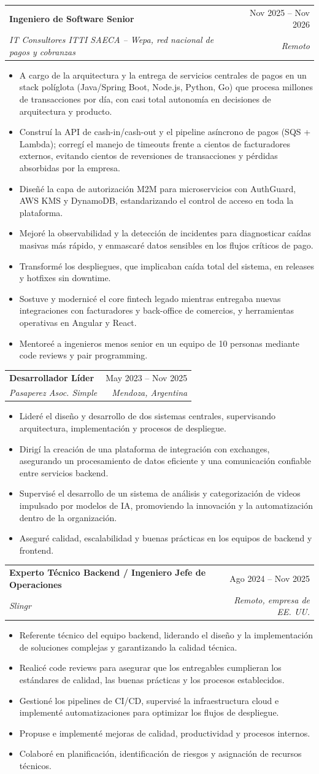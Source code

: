 \documentclass[letterpaper,11pt]{article}
\makeatletter
\newcommand{\resumeItem}[1]{
  \item\small{
    {#1 \vspace{-1pt}}
  }
}
\newcommand{\resumeSubheading}[4]{
  \needspace{4\baselineskip}\vspace{-1pt}\item
    \begin{tabular*}{0.97\textwidth}[t]{l@{\extracolsep{\fill}}r}
      \textbf{#1} & #2 \\
      \textit{\small#3} & \textit{\small #4} \\
    \end{tabular*}\vspace{-5pt}
}
\newcommand{\resumeItemListStart}{\begin{itemize}}
\newcommand{\resumeItemListEnd}{\end{itemize}\vspace{-3pt}}
\makeatother
\begin{document}
\resumeSubheading
  {Ingeniero de Software Senior}{Nov 2025 -- Nov 2026}
  {IT Consultores ITTI SAECA -- Wepa, red nacional de pagos y cobranzas}{Remoto}
  \resumeItemListStart
    \resumeItem{A cargo de la arquitectura y la entrega de servicios centrales de pagos en un stack políglota (Java/Spring Boot, Node.js, Python, Go) que procesa millones de transacciones por día, con casi total autonomía en decisiones de arquitectura y producto.}
    \resumeItem{Construí la API de cash-in/cash-out y el pipeline asíncrono de pagos (SQS + Lambda); corregí el manejo de timeouts frente a cientos de facturadores externos, evitando cientos de reversiones de transacciones y pérdidas absorbidas por la empresa.}
    \resumeItem{Diseñé la capa de autorización M2M para microservicios con AuthGuard, AWS KMS y DynamoDB, estandarizando el control de acceso en toda la plataforma.}
    \resumeItem{Mejoré la observabilidad y la detección de incidentes para diagnosticar caídas masivas más rápido, y enmascaré datos sensibles en los flujos críticos de pago.}
    \resumeItem{Transformé los despliegues, que implicaban caída total del sistema, en releases y hotfixes sin downtime.}
    \resumeItem{Sostuve y modernicé el core fintech legado mientras entregaba nuevas integraciones con facturadores y back-office de comercios, y herramientas operativas en Angular y React.}
    \resumeItem{Mentoreé a ingenieros menos senior en un equipo de 10 personas mediante code reviews y pair programming.}
  \resumeItemListEnd

\resumeSubheading
  {Desarrollador Líder}{May 2023 -- Nov 2025}
  {Pasaperez Asoc. Simple}{Mendoza, Argentina}
  \resumeItemListStart
    \resumeItem{Lideré el diseño y desarrollo de dos sistemas centrales, supervisando arquitectura, implementación y procesos de despliegue.}
    \resumeItem{Dirigí la creación de una plataforma de integración con exchanges, asegurando un procesamiento de datos eficiente y una comunicación confiable entre servicios backend.}
    \resumeItem{Supervisé el desarrollo de un sistema de análisis y categorización de videos impulsado por modelos de IA, promoviendo la innovación y la automatización dentro de la organización.}
    \resumeItem{Aseguré calidad, escalabilidad y buenas prácticas en los equipos de backend y frontend.}
  \resumeItemListEnd

  \resumeSubheading
  {Experto Técnico Backend / Ingeniero Jefe de Operaciones}{Ago 2024 -- Nov 2025}
  {Slingr}{Remoto, empresa de EE. UU.}
  \resumeItemListStart
    \resumeItem{Referente técnico del equipo backend, liderando el diseño y la implementación de soluciones complejas y garantizando la calidad técnica.}
    \resumeItem{Realicé code reviews para asegurar que los entregables cumplieran los estándares de calidad, las buenas prácticas y los procesos establecidos.}
    \resumeItem{Gestioné los pipelines de CI/CD, supervisé la infraestructura cloud e implementé automatizaciones para optimizar los flujos de despliegue.}
    \resumeItem{Propuse e implementé mejoras de calidad, productividad y procesos internos.}
    \resumeItem{Colaboré en planificación, identificación de riesgos y asignación de recursos técnicos.}
  \resumeItemListEnd
\end{document}
